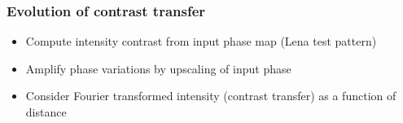 \documentclass{beamer}
\renewcommand{\vec}{\mathbold}
\newcommand{\vecxi}{\vec{\xi}}
\newcommand{\abs}[1]{\left| #1 \right|} %
\newcommand{\F}{\mathcal{F}}
\begin{document}
\begin{frame}
  \frametitle{Evolution of contrast transfer}
  \begin{itemize}
  \item Compute intensity contrast from input phase map (Lena test pattern)
  \item Amplify phase variations by upscaling of input phase
  \item Consider Fourier transformed intensity (contrast transfer) as a
    function of distance
  \end{itemize}
  \begin{columns}
\end{columns}
\end{frame}
\end{document}
